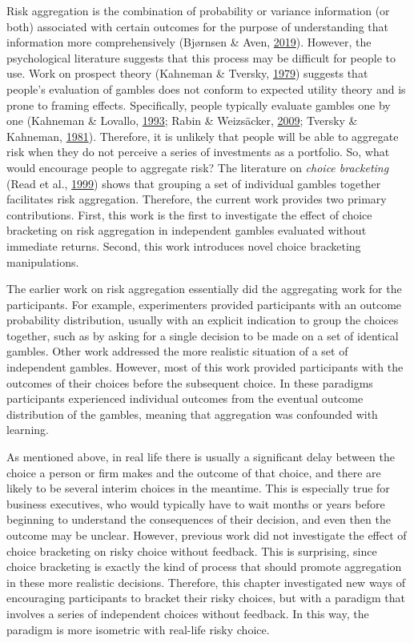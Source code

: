 \documentclass[
  english,
  man, donotrepeattitle,floatsintext]{apa7}
\theoremstyle{definition}
\theoremstyle{definition}
\theoremstyle{definition}
\theoremstyle{definition}
\theoremstyle{remark}
\begin{document}
Risk aggregation is the combination of probability or variance information (or
both) associated with certain outcomes for the purpose of understanding that
information more comprehensively (Bjørnsen \& Aven, \protect\hyperlink{ref-bjornsen2019}{2019}). However, the psychological
literature suggests that this process may be difficult for people to use. Work
on prospect theory (Kahneman \& Tversky, \protect\hyperlink{ref-kahneman1979}{1979}) suggests that people's evaluation of gambles
does not conform to expected utility theory and is prone to framing effects.
Specifically, people typically evaluate gambles one by one (Kahneman \& Lovallo, \protect\hyperlink{ref-kahneman1993}{1993}; Rabin \& Weizsäcker, \protect\hyperlink{ref-rabin2009}{2009}; Tversky \& Kahneman, \protect\hyperlink{ref-tversky1981}{1981}). Therefore, it is unlikely that people will be able
to aggregate risk when they do not perceive a series of investments as a
portfolio. So, what would encourage people to aggregate risk? The literature on
\emph{choice bracketing} (Read et al., \protect\hyperlink{ref-read1999}{1999}) shows that grouping a set of individual gambles
together facilitates risk aggregation. Therefore, the current work provides two
primary contributions. First, this work is the first to investigate the effect
of choice bracketing on risk aggregation in independent gambles evaluated
without immediate returns. Second, this work introduces novel choice bracketing
manipulations.

The earlier work on risk aggregation essentially did the aggregating work for
the participants. For example, experimenters provided participants with an
outcome probability distribution, usually with an explicit indication to group
the choices together, such as by asking for a single decision to be made on a
set of identical gambles. Other work addressed the more realistic situation of a
set of independent gambles. However, most of this work provided participants
with the outcomes of their choices before the subsequent choice. In these
paradigms participants experienced individual outcomes from the eventual outcome
distribution of the gambles, meaning that aggregation was confounded with
learning.

As mentioned above, in real life there is usually a significant delay between
the choice a person or firm makes and the outcome of that choice, and there are
likely to be several interim choices in the meantime. This is especially true
for business executives, who would typically have to wait months or years before
beginning to understand the consequences of their decision, and even then the
outcome may be unclear. However, previous work did not investigate the effect of
choice bracketing on risky choice without feedback. This is surprising, since
choice bracketing is exactly the kind of process that should promote aggregation
in these more realistic decisions. Therefore, this chapter investigated new ways
of encouraging participants to bracket their risky choices, but with a paradigm
that involves a series of independent choices without feedback. In this way, the
paradigm is more isometric with real-life risky choice.
\end{document}

